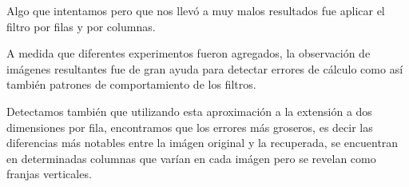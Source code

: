 Algo que intentamos pero que nos llev\'o a muy malos resultados fue aplicar el filtro por filas y por columnas.

A medida que diferentes experimentos fueron agregados, la observaci\'on de
im\'agenes resultantes fue de gran ayuda para detectar errores de c\'alculo como
as\'i tambi\'en patrones de comportamiento de los filtros.

Detectamos tambi\'en que utilizando esta aproximaci\'on a la extensi\'on a dos
dimensiones por fila, encontramos que los errores m\'as groseros, es decir las
diferencias m\'as notables entre la im\'agen original y la recuperada, se
encuentran en determinadas columnas que var\'ian en cada im\'agen pero se
revelan como franjas verticales.
